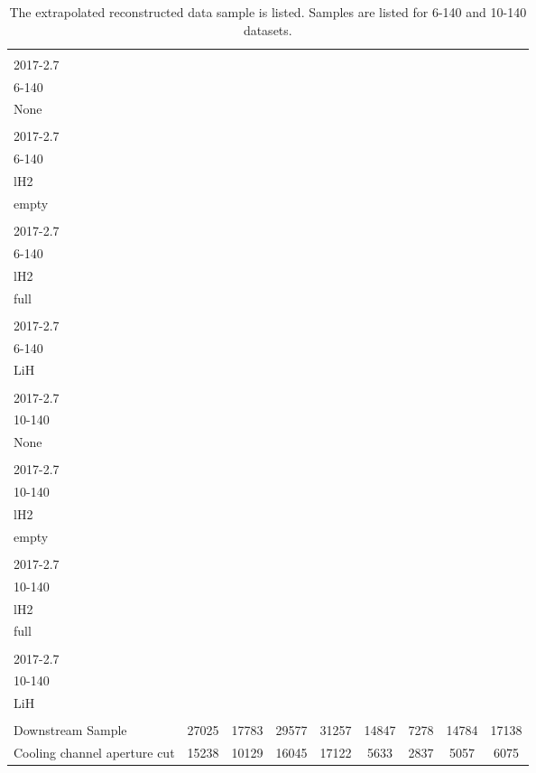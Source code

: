 \begin{landscape}
\begin{table}
\centering
\caption{The extrapolated reconstructed data sample is listed.  Samples are listed for 6-140 and 10-140 datasets.\label{tab:data_cuts_summary_2_1}}
\begin{tabular}[pos]{l|cccccccc}
                                                   & \splitcell{\\2017-2.7\\6-140\\None\\} & \splitcell{\\2017-2.7\\6-140\\lH2\\empty\\} & \splitcell{\\2017-2.7\\6-140\\lH2\\full\\} & \splitcell{\\2017-2.7\\6-140\\LiH\\} & \splitcell{\\2017-2.7\\10-140\\None\\} & \splitcell{\\2017-2.7\\10-140\\lH2\\empty\\} & \splitcell{\\2017-2.7\\10-140\\lH2\\full\\} & \splitcell{\\2017-2.7\\10-140\\LiH\\} \\
\hline                                            
Downstream Sample                                  &   27025  &   17783  &   29577  &   31257  &   14847  &    7278  &   14784  &   17138  \\
\hline                                            
Cooling channel aperture cut                       &   15238  &   10129  &   16045  &   17122  &    5633  &    2837  &    5057  &    6075  \\

\end{tabular}
\end{table}
\end{landscape}
